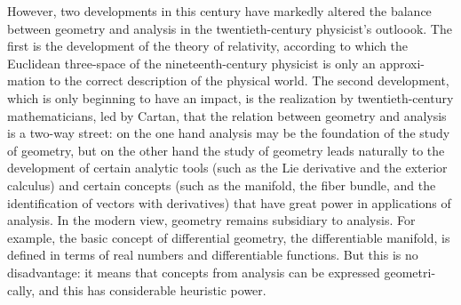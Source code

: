 \documentclass[10pt]{article}
\begin{document}
However, two developments in this century have markedly altered the balance
between geometry and analysis in the twentieth-century physicist's outloook.
The first is the development of the theory of relativity, according to which the
Euclidean three-space of the nineteenth-century physicist is only an approxi-
mation to the correct description of the physical world. The second development,
which is only beginning to have an impact, is the realization by twentieth-century mathematicians, led by Cartan, that the relation between geometry and analysis is a two-way street: on the one hand analysis may be the foundation of the study
of geometry, but on the other hand the study of geometry leads naturally to the
development of certain analytic tools (such as the Lie derivative and the exterior
calculus) and certain concepts (such as the manifold, the fiber bundle, and the
identification of vectors with derivatives) that have great power in applications
of analysis. In the modern view, geometry remains subsidiary to analysis. For
example, the basic concept of differential geometry, the differentiable manifold,
is defined in terms of real numbers and differentiable functions. But this is no
disadvantage: it means that concepts from analysis can be expressed geometri-
cally, and this has considerable heuristic power.
\end{document}
